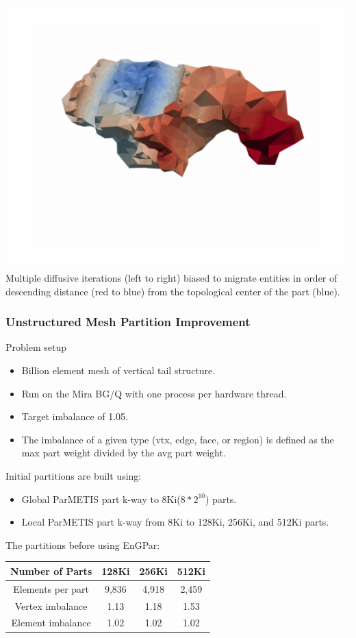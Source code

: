 \documentclass[aspectratio=169]{beamer}
\begin{document}
\begin{frame}
      \includegraphics[width=.2\textwidth]{figures/engparDiffusion/5.jpg} \\
      \small{Multiple diffusive iterations (left to right) biased
      to migrate entities in order of descending distance (red to blue) from the
      topological center of the part (blue).}
\end{frame}

\begin{frame}
  \frametitle{Unstructured Mesh Partition Improvement}
  \medskip
  Problem setup
  \begin{itemize}
    \item Billion element mesh of vertical tail structure.
    \item Run on the Mira BG/Q with one process per hardware thread.
    \item Target imbalance of 1.05.
    \item The imbalance of a given type (vtx, edge,
      face, or region) is defined as the max part
      weight divided by the avg part weight.
  \end{itemize}
  Initial partitions are built using:
  \begin{itemize}
  \item Global ParMETIS part k-way to 8Ki($8*2^{10}$) parts.
  \item Local ParMETIS part k-way from 8Ki to 128Ki, 256Ki, and 512Ki parts.
  \end{itemize}
  The partitions before using EnGPar:\\
  \begin{table}[!h]
    \small
    \centering
    \begin{tabular}{||c|c|c|c||}
      \hline
      Number of Parts &128Ki&256Ki&512Ki \\
      \hline
      Elements per part & 9,836 & 4,918&2,459  \\
      \hline
      Vertex imbalance & 1.13 & 1.18 & 1.53 \\
      \hline
      Element imbalance & 1.02& 1.02& 1.02\\
      \hline
    \end{tabular}
  \end{table}
\end{frame}
\end{document}
